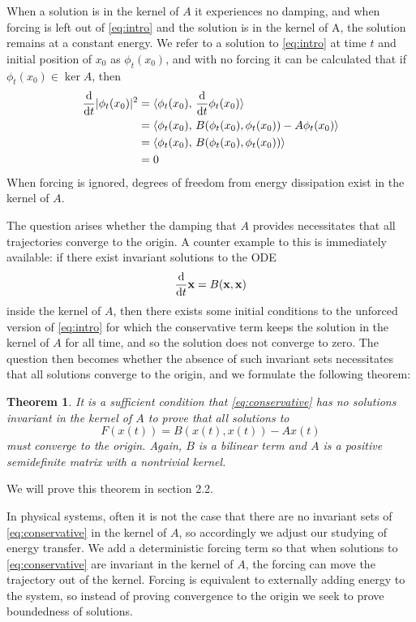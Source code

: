 \documentclass[11pt]{article}
\newtheorem{theorem}{Theorem}
\newtheorem{theorem}{Theorem}
\begin{document}
When a solution is in the kernel of $A$ it experiences no damping, and when forcing is left out of \eqref{eq:intro} and the solution is in the kernel of A, the solution remains at a constant energy. We refer to a solution to \eqref{eq:intro} at time $t$ and initial position of $x_0$ as $\phi_t(x_0)$, and with no forcing it can be calculated that if $\phi_t(x_0) \in \ker A$, then 
\begin{align*}
    \dv{}{t}|\phi_t(x_0)|^2 &= \langle \phi_t(x_0), \, \dv{}{t} \phi_t(x_0) \rangle\\
    &= \langle \phi_t(x_0), \,  B(\phi_t(x_0), \phi_t(x_0)) - A\phi_t(x_0) \rangle\\
    &= \langle \phi_t(x_0), \,  B(\phi_t(x_0), \phi_t(x_0))\rangle\\
    &= 0
\end{align*}
When forcing is ignored, degrees of freedom from energy dissipation exist in the kernel of $A$. 

The question arises whether the damping that $A$ provides necessitates that all trajectories converge to the origin. A counter example to this is immediately available: if there exist invariant solutions to the ODE 
\begin{equation}\label{eq:conservative}
    \dv{}{t}\mathbf{x} = B(\mathbf{x}, \mathbf{x})\\
\end{equation}
inside the kernel of $A$, then there exists some initial conditions to the unforced version of \eqref{eq:intro} for which the conservative term keeps the solution in the kernel of $A$ for all time, and so the solution does not converge to zero. The question then becomes whether the absence of such invariant sets necessitates that all solutions converge to the origin, and we formulate the following theorem:
\begin{theorem}\label{th:1}
    It is a sufficient condition that \eqref{eq:conservative} has no solutions invariant in the kernel of $A$ to prove that all solutions to \begin{equation}\label{eq:unforced}
    F(x(t)) = B(x(t), x(t)) - Ax(t)
\end{equation} must converge to the origin. Again, $B$ is a bilinear term and $A$ is a positive semidefinite matrix with a nontrivial kernel. 
\end{theorem}
We will prove this theorem in section 2.2. 

In physical systems, often it is not the case that there are no invariant sets of \eqref{eq:conservative} in the kernel of $A$, so accordingly we adjust our studying of energy transfer. We add a deterministic forcing term so that when solutions to \eqref{eq:conservative} are invariant in the kernel of $A$, the forcing can move the trajectory out of the kernel. Forcing is equivalent to externally adding energy to the system, so instead of proving convergence to the origin we seek to prove boundedness of solutions. 
\end{document}
